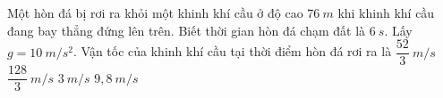 \begin{vidu}
Một hòn đá bị rơi ra khỏi một khinh khí cầu ở độ cao $76\ m$ khi khinh khí cầu đang bay thẳng đứng lên trên. Biết thời gian hòn đá chạm đất là $6\ s$. Lấy $g=10\ m/s^2$. Vận tốc của khinh khí cầu tại thời điểm hòn đá rơi ra là
\choice
{\True $\dfrac{52}{3}\ m/s$}
{$\dfrac{128}{3}\ m/s$}
{$3\ m/s$}
{$9,8\ m/s$}

\end{vidu}
